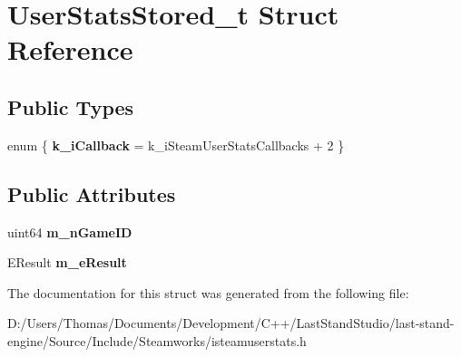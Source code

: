 \hypertarget{structUserStatsStored__t}{}\section{User\+Stats\+Stored\+\_\+t Struct Reference}
\label{structUserStatsStored__t}
\subsection*{Public Types}
\begin{DoxyCompactItemize}
\item 
\hypertarget{structUserStatsStored__t_abc7f606106ca27019ce308372c096129}{}enum \{ {\bfseries k\+\_\+i\+Callback} = k\+\_\+i\+Steam\+User\+Stats\+Callbacks + 2
 \}\label{structUserStatsStored__t_abc7f606106ca27019ce308372c096129}

\end{DoxyCompactItemize}
\subsection*{Public Attributes}
\begin{DoxyCompactItemize}
\item 
\hypertarget{structUserStatsStored__t_a084d454207004ec5595c65ffbedeac9f}{}uint64 {\bfseries m\+\_\+n\+Game\+I\+D}\label{structUserStatsStored__t_a084d454207004ec5595c65ffbedeac9f}

\item 
\hypertarget{structUserStatsStored__t_a2be31244337a3284abddb90ad594e491}{}E\+Result {\bfseries m\+\_\+e\+Result}\label{structUserStatsStored__t_a2be31244337a3284abddb90ad594e491}

\end{DoxyCompactItemize}


The documentation for this struct was generated from the following file\+:\begin{DoxyCompactItemize}
\item 
D\+:/\+Users/\+Thomas/\+Documents/\+Development/\+C++/\+Last\+Stand\+Studio/last-\/stand-\/engine/\+Source/\+Include/\+Steamworks/isteamuserstats.\+h\end{DoxyCompactItemize}
